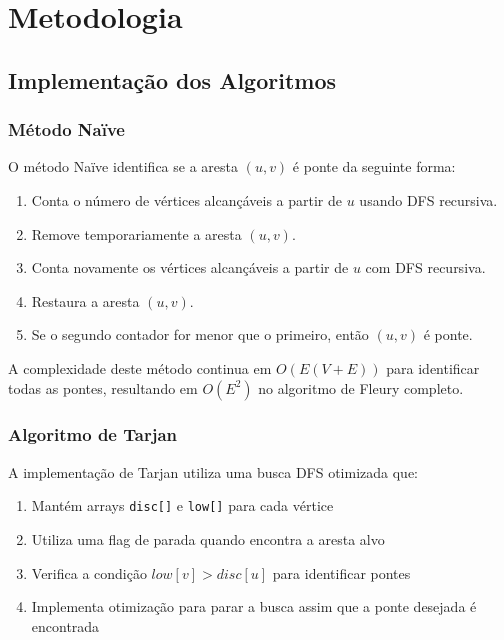 \documentclass[12pt]{article}
\begin{document}
\section{Metodologia}

\subsection{Implementação dos Algoritmos}

\subsubsection{Método Naïve}

O método Naïve identifica se a aresta \((u,v)\) é ponte da seguinte forma:

\begin{enumerate}
  \item Conta o número de vértices alcançáveis a partir de \(u\) usando DFS recursiva.
  \item Remove temporariamente a aresta \((u,v)\).
  \item Conta novamente os vértices alcançáveis a partir de \(u\) com DFS recursiva.
  \item Restaura a aresta \((u,v)\).
  \item Se o segundo contador for menor que o primeiro, então \((u,v)\) é ponte.
\end{enumerate}

A complexidade deste método continua em \(O(E(V+E))\) para identificar todas as pontes, resultando em \(O(E^2)\) no algoritmo de Fleury completo.

\subsubsection{Algoritmo de Tarjan}

A implementação de Tarjan utiliza uma busca DFS otimizada que:

\begin{enumerate}
\item Mantém arrays \texttt{disc[]} e \texttt{low[]} para cada vértice
\item Utiliza uma flag de parada quando encontra a aresta alvo
\item Verifica a condição $low[v] > disc[u]$ para identificar pontes
\item Implementa otimização para parar a busca assim que a ponte desejada é encontrada
\end{enumerate}
\end{document}
